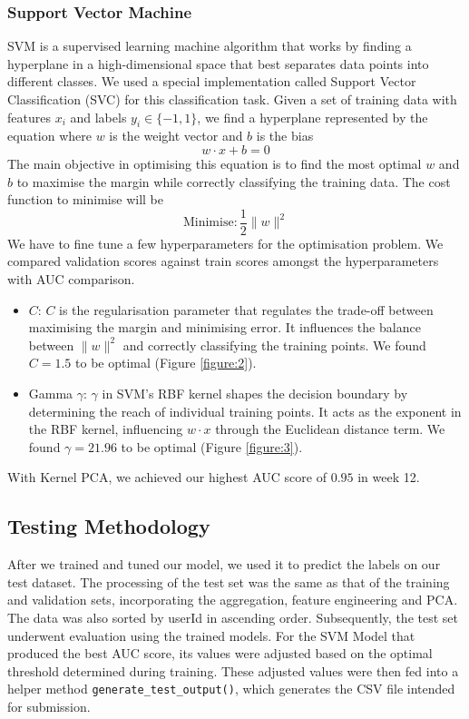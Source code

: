 \documentclass[12pt]{article}
\begin{document}
\subsubsection{Support Vector Machine}
SVM is a supervised learning machine algorithm that works by finding a hyperplane in a high-dimensional space that best separates data points into different classes. We used a special implementation called Support Vector Classification (SVC) for this classification task. Given a set of training data with features $x_i$ and labels $y_i \in \{-1, 1\}$, we find a hyperplane represented by the equation where $w$ is the weight vector and $b$ is the bias
$$
  w\cdot x + b = 0
$$
The main objective in optimising this equation is to find the most optimal $w$ and $b$ to maximise the margin while correctly classifying the training data. The cost function to minimise will be
$$
  \text{Minimise}: \frac{1}{2}\lVert w\rVert^2
$$
We have to fine tune a few hyperparameters for the optimisation problem. We compared validation scores against train scores amongst the hyperparameters with AUC comparison.

\begin{itemize}
  \item $C$: $C$ is the regularisation parameter that regulates the trade-off between maximising the margin and minimising error. It influences the balance between $\lVert w\rVert^2$ and correctly classifying the training points. We found $C=1.5$ to be optimal (Figure \ref{figure:2}).
  \item Gamma $\gamma$: $\gamma$ in SVM's RBF kernel shapes the decision boundary by determining the reach of individual training points. It acts as the exponent in the RBF kernel, influencing $w\cdot x$ through the Euclidean distance term. We found $\gamma = 21.96$ to be optimal (Figure \ref{figure:3}).
\end{itemize}
With Kernel PCA, we achieved our highest AUC score of $0.95$ in week 12.

\subsection{Testing Methodology}
After we trained and tuned our model, we used it to predict the labels on our test dataset. The processing of the test set was the same as that of the training and validation sets, incorporating the aggregation, feature engineering and PCA. The data was also sorted by userId in ascending order. Subsequently, the test set underwent evaluation using the trained models. For the SVM Model that produced the best AUC score, its values were adjusted based on the optimal threshold determined during training. These adjusted values were then fed into a helper method \lstinline{generate_test_output()}, which generates the CSV file intended for submission.
\end{document}
